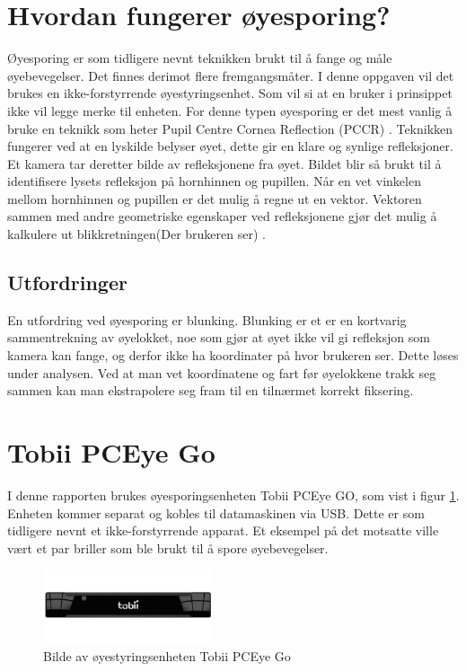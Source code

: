\documentclass[phd,tocprelim]{cornell}
\begin{document}
\section{Hvordan fungerer øyesporing?}

Øyesporing er som tidligere nevnt teknikken brukt til å fange og måle øyebevegelser.
Det finnes derimot flere fremgangsmåter. I denne oppgaven vil det brukes en ikke-forstyrrende øyestyringsenhet. Som vil si at en bruker i prinsippet ikke vil legge merke til enheten. For denne typen øyesporing er det mest vanlig å bruke en teknikk som heter Pupil Centre Cornea Reflection (\gls{PCCR}) \cite{Calibration}. Teknikken fungerer ved at en lyskilde belyser øyet, dette gir en klare og synlige refleksjoner. Et kamera tar deretter bilde av refleksjonene fra øyet. Bildet blir så brukt til å identifisere lysets refleksjon på hornhinnen og pupillen. Når en vet vinkelen mellom hornhinnen og pupillen er det mulig å regne ut en vektor. Vektoren sammen med andre geometriske egenskaper ved refleksjonene gjør det mulig å kalkulere ut blikkretningen(Der brukeren ser) \cite{Calibration}.


\subsection{Utfordringer}

En utfordring ved øyesporing er blunking. Blunking er et er en kortvarig sammentrekning av øyelokket, noe som gjør at øyet ikke vil gi refleksjon som kamera kan fange, og derfor ikke ha koordinater på hvor brukeren ser. Dette løses under analysen. Ved at man vet koordinatene og fart før øyelokkene trakk seg sammen kan man ekstrapolere seg fram til en tilnærmet korrekt fiksering. 

\section{Tobii PCEye Go}

I denne rapporten brukes øyesporingsenheten Tobii PCEye GO, som vist i figur \ref{fig:tobiiPc}. Enheten kommer separat og kobles til datamaskinen via USB. Dette er som tidligere nevnt et ikke-forstyrrende apparat. Et eksempel på det motsatte ville vært et par briller som ble brukt til å spore øyebevegelser. 



\begin{figure}[ht!]
\centering
\includegraphics[width=50mm]{TobiiEyeGo}
\caption{Bilde av øyestyringsenheten Tobii PCEye Go}
\label{fig:tobiiPc}
\end{figure}
\end{document}
